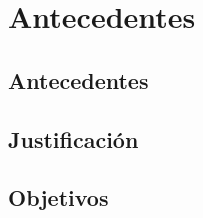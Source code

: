 \chapter{Antecedentes}
\begin{indentar}
\end{indentar}

\section{Antecedentes}
\begin{indentar}
\end{indentar}

\section{Justificaci\'on}
\begin{indentar}
\end{indentar}

\section{Objetivos}
\begin{indentar}
\end{indentar}